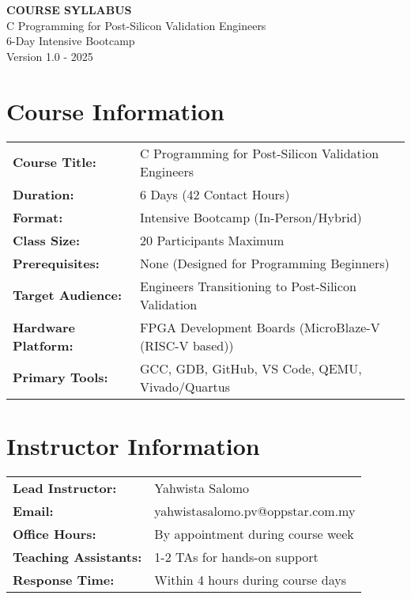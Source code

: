 \documentclass[11pt,a4paper]{article}
\begin{document}
\begin{center}
    {\Huge\bfseries\color{courseblue} COURSE SYLLABUS}\\[0.5cm]
    {\Large C Programming for Post-Silicon Validation Engineers}\\[0.3cm]
    {\large 6-Day Intensive Bootcamp}\\[0.2cm]
    {\normalsize Version 1.0 - 2025}
\end{center}

\vspace{1cm}

\section{Course Information}

\begin{tabular}{ll}
\textbf{Course Title:} & C Programming for Post-Silicon Validation Engineers \\
\textbf{Duration:} & 6 Days (42 Contact Hours) \\
\textbf{Format:} & Intensive Bootcamp (In-Person/Hybrid) \\
\textbf{Class Size:} & 20 Participants Maximum \\
\textbf{Prerequisites:} & None (Designed for Programming Beginners) \\
\textbf{Target Audience:} & Engineers Transitioning to Post-Silicon Validation \\
\textbf{Hardware Platform:} & FPGA Development Boards (MicroBlaze-V (RISC-V based)) \\
\textbf{Primary Tools:} & GCC, GDB, GitHub, VS Code, QEMU, Vivado/Quartus \\
\end{tabular}

\section{Instructor Information}

\begin{tabular}{ll}
\textbf{Lead Instructor:} & Yahwista Salomo \\
\textbf{Email:} & yahwistasalomo.pv@oppstar.com.my \\
\textbf{Office Hours:} & By appointment during course week \\
\textbf{Teaching Assistants:} & 1-2 TAs for hands-on support \\
\textbf{Response Time:} & Within 4 hours during course days \\
\end{tabular}
\end{document}
